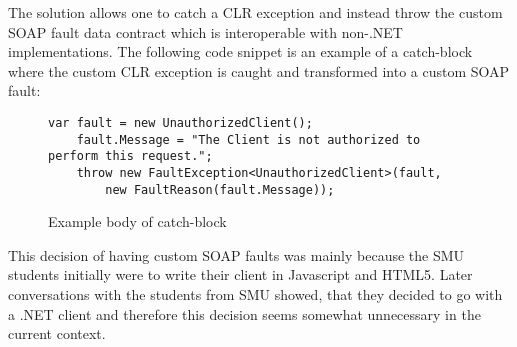 \documentclass[../report.tex]{subfiles}
\begin{document}
The solution allows one to catch a CLR exception and instead throw the custom SOAP fault data contract which is interoperable with non-.NET implementations. The following code snippet is an example of a catch-block where the custom CLR exception is caught and transformed into a custom SOAP fault:


\begin{figure}[H]
\begin{lstlisting}[frame=single]
    var fault = new UnauthorizedClient();
    fault.Message = "The Client is not authorized to perform this request.";
    throw new FaultException<UnauthorizedClient>(fault, 
        new FaultReason(fault.Message));
\end{lstlisting}
\caption{Example body of catch-block}
\end{figure}

This decision of having custom SOAP faults was mainly because the SMU students initially were to write their client in Javascript and HTML5. Later conversations with the students from SMU showed, that they decided to go with a .NET client and therefore this decision seems somewhat unnecessary in the current context. 
\end{document}
